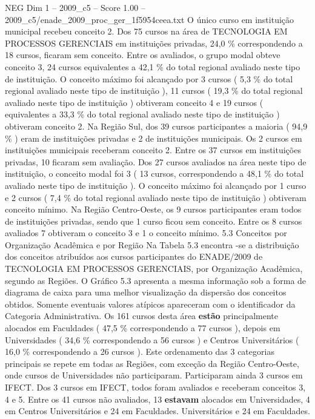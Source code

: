\begin{textsample}{NEG Dim 1 – 2009\_c5 – Score 1.00 – 2009\_c5/enade\_2009\_proc\_ger\_1f5954ceea.txt}
O único curso em instituição municipal recebeu conceito 2.
Dos 75 cursos na área de TECNOLOGIA EM PROCESSOS GERENCIAIS em instituições privadas, 24,0 \% correspondendo a 18 cursos, ficaram sem conceito.
Entre os avaliados, o grupo modal obteve conceito 3, 24 cursos equivalentes a 42,1 \% do total regional avaliado neste tipo de instituição.
O conceito máximo foi alcançado por 3 cursos ( 5,3 \% do total regional avaliado neste tipo de instituição ), 11 cursos ( 19,3 \% do total regional avaliado neste tipo de instituição ) obtiveram conceito 4 e 19 cursos ( equivalentes a 33,3 \% do total regional avaliado neste tipo de instituição ) obtiveram conceito 2.
Na Região Sul, dos 39 cursos participantes a maioria ( 94,9 \% ) eram de instituições privadas e 2 de instituições municipais.
Os 2 cursos em instituições municipais receberam conceito 2.
Entre os 37 cursos em instituições privadas, 10 ficaram sem avaliação.
Dos 27 cursos avaliados na área neste tipo de instituição, o conceito modal foi 3 ( 13 cursos, correspondendo a 48,1 \% do total avaliado neste tipo de instituição ).
O conceito máximo foi alcançado por 1 curso e 2 cursos ( 7,4 \% do total regional avaliado neste tipo de instituição ) obtiveram conceito mínimo.
Na Região Centro-Oeste, os 9 cursos participantes eram todos de instituições privadas, sendo que 1 curso ficou sem conceito.
Entre os 8 cursos avaliados 7 obtiveram o conceito 3 e 1 o conceito mínimo. 5.3 Conceitos por Organização Acadêmica e por Região Na Tabela 5.3 encontra -se a distribuição dos conceitos atribuídos aos cursos participantes do ENADE/2009 de TECNOLOGIA EM PROCESSOS GERENCIAIS, por Organização Acadêmica, segundo as Regiões.
O Gráfico 5.3 apresenta a mesma informação sob a forma de diagrama de caixa para uma melhor visualização da dispersão dos conceitos obtidos.
Somente eventuais valores atípicos apareceram com o identificador da Categoria Administrativa.
Os 161 cursos desta área \textbf{estão} principalmente alocados em Faculdades ( 47,5 \% correspondendo a 77 cursos ), depois em Universidades ( 34,6 \% correspondendo a 56 cursos ) e Centros Universitários ( 16,0 \% correspondendo a 26 cursos ).
Este ordenamento das 3 categorias principais se repete em todas as Regiões, com exceção da Região Centro-Oeste, onde cursos de Universidades não participaram.
Participaram ainda 3 cursos em IFECT.
Dos 3 cursos em IFECT, todos foram avaliados e receberam conceitos 3, 4 e 5.
Entre os 41 cursos não avaliados, 13 \textbf{estavam} alocados em Universidades, 4 em Centros Universitários e 24 em Faculdades.
Universitários e 24 em Faculdades.

\end{textsample}
